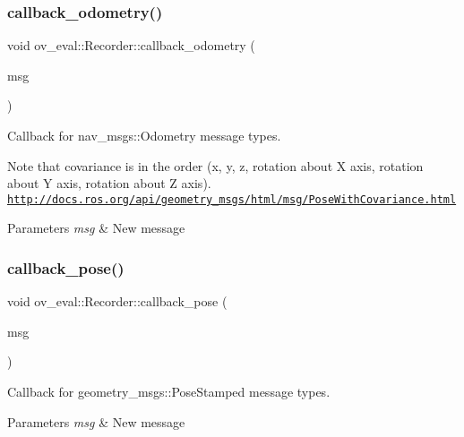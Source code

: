 \subsubsection{\texorpdfstring{callback\+\_\+odometry()}{callback\_odometry()}}
{\footnotesize\ttfamily void ov\+\_\+eval\+::\+Recorder\+::callback\+\_\+odometry (\begin{DoxyParamCaption}\item[{const nav\+\_\+msgs\+::\+Odometry\+Ptr \&}]{msg }\end{DoxyParamCaption})\hspace{0.3cm}{\ttfamily [inline]}}



Callback for nav\+\_\+msgs\+::\+Odometry message types. 

Note that covariance is in the order (x, y, z, rotation about X axis, rotation about Y axis, rotation about Z axis). \href{http://docs.ros.org/api/geometry_msgs/html/msg/PoseWithCovariance.html}{\tt http\+://docs.\+ros.\+org/api/geometry\+\_\+msgs/html/msg/\+Pose\+With\+Covariance.\+html}


\begin{DoxyParams}{Parameters}
{\em msg} & New message \\
\hline
\end{DoxyParams}
\mbox{\label{classov__eval_1_1Recorder_a0a2cc6684a70ab530c8d7c31ebc1ba9e}} 
\subsubsection{\texorpdfstring{callback\+\_\+pose()}{callback\_pose()}}
{\footnotesize\ttfamily void ov\+\_\+eval\+::\+Recorder\+::callback\+\_\+pose (\begin{DoxyParamCaption}\item[{const geometry\+\_\+msgs\+::\+Pose\+Stamped\+Ptr \&}]{msg }\end{DoxyParamCaption})\hspace{0.3cm}{\ttfamily [inline]}}



Callback for geometry\+\_\+msgs\+::\+Pose\+Stamped message types. 


\begin{DoxyParams}{Parameters}
{\em msg} & New message \\
\hline
\end{DoxyParams}
\mbox{\label{classov__eval_1_1Recorder_afe156131ed31a4f35d7fea30d4221293}} 
